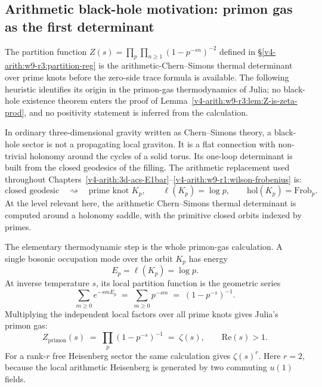 \subsection{Arithmetic black-hole motivation: primon gas as the first determinant}
\label{v4-arith:w9-r3:black-hole-primon-motivation}

The partition function \(Z(s)=\prod_{p}\prod_{n\geq 1}(1-p^{-sn})^{-2}\)
defined in \S\ref{v4-arith:w9-r3:partition-reg} is the arithmetic-Chern--Simons
thermal determinant over prime knots before the zero-side trace formula is
available. The following heuristic identifies its origin in the primon-gas
thermodynamics of Julia; no black-hole existence theorem enters the proof of
Lemma~\ref{v4-arith:w9-r3:lem:Z-is-zeta-prod}, and no positivity statement
is inferred from the calculation.

In ordinary three-dimensional gravity written as Chern--Simons
theory, a black-hole sector is not a propagating local graviton. It is
a flat connection with non-trivial holonomy around the cycles of a
solid torus. Its one-loop determinant is built from the closed
geodesics of the filling. The arithmetic replacement used throughout
Chapters~\ref{v4-arith:3d-acs-E1bar}--\ref{v4-arith:w9-r1:wilson-frobenius}
is:
\begin{equation}
\label{v4-arith:w9-r3:eq:black-hole-dictionary}
\text{closed geodesic}\quad\rightsquigarrow\quad
\text{prime knot }K_{p},\qquad
\ell(K_{p})=\log p,\qquad
\mathrm{hol}(K_{p})=\mathrm{Frob}_{p}.
\end{equation}
At the level relevant here, the arithmetic Chern--Simons thermal
determinant is computed around a holonomy saddle, with the primitive
closed orbits indexed by primes.

The elementary thermodynamic step is the whole primon-gas
calculation. A single bosonic occupation mode over the orbit \(K_{p}\)
has energy
\begin{equation}
\label{v4-arith:w9-r3:eq:primon-energy}
E_{p}=\ell(K_{p})=\log p .
\end{equation}
At inverse temperature \(s\), its local partition function is the
geometric series
\begin{equation}
\label{v4-arith:w9-r3:eq:single-primon-factor}
\sum_{m\geq0}e^{-smE_{p}}
\;=\;\sum_{m\geq0}p^{-sm}
\;=\;(1-p^{-s})^{-1}.
\end{equation}
Multiplying the independent local factors over all prime knots gives
Julia's primon gas:
\begin{equation}
\label{v4-arith:w9-r3:eq:primon-zeta}
Z_{\mathrm{primon}}(s)
\;=\;\prod_{p}(1-p^{-s})^{-1}
\;=\;\zeta(s),\qquad \mathrm{Re}(s)>1.
\end{equation}
For a rank-\(r\) free Heisenberg sector the same calculation gives
\(\zeta(s)^{r}\). Here \(r=2\), because the local
arithmetic Heisenberg is generated by two commuting \(u(1)\) fields.

